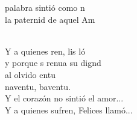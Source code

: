 \begin{cancion}
	palabra sintió como n  \\
	la paternid de aquel Am \\\jump\\
	\begin{chorus}%
	Y a quienes ren, lis ló \\
	y porque s renua su dignd\\
	al olvido entu\\
	naventu, baventu.  \\
Y el corazón no sintió el amor...\\
Y a quienes sufren, Felices llamó...\\
	\end{chorus}%
	\jump\\
\end{cancion}%
